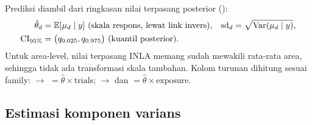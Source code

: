 Prediksi diambil dari ringkasan nilai terpasang posterior ():
\begin{equation}
\begin{aligned}
  \hat\theta_d&=\mathbb E[\mu_d\mid y]\ \text{(skala respons, lewat link invers)},
  & \mathrm{sd}_d&=\sqrt{\operatorname{Var}(\mu_d\mid y)},\\
  \mathrm{CI}_{95\%}&=\bigl(q_{0.025},q_{0.975}\bigr)
    \ \text{(kuantil posterior)}.
\end{aligned}
  \label{eq:hbarea-pred}
\end{equation}
Untuk area-level, nilai terpasang INLA memang sudah mewakili rata-rata area,
sehingga tidak ada transformasi skala tambahan. Kolom turunan
dihitung sesuai family:  $\to$ 
$=\hat\theta\times\text{trials}$;  $\to$  dan
 $=\hat\theta\times\text{exposure}$.


\subsection{Estimasi komponen varians}\label{sec:hbarea-varians}

